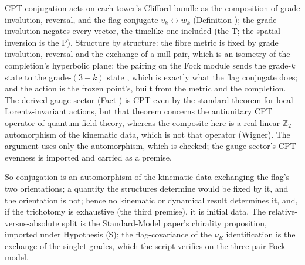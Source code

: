 CPT conjugation acts on each tower's Clifford bundle as the composition of grade involution, reversal, and the flag conjugate $v_{k} \leftrightarrow w_{k}$ (Definition ); the grade involution negates every vector, the timelike one included (the T; the spatial inversion is the P). Structure by structure: the fibre metric is fixed by grade involution, reversal and the exchange of a null pair, which is an isometry of the completion's hyperbolic plane; the pairing on the Fock module sends the grade-$k$ state to the grade-$(3-k)$ state \cite[Prop.~5.6]{ButlerT12}, which is exactly what the flag conjugate does; and the action is the frozen point's, built from the metric and the completion. The derived gauge sector (Fact ) is CPT-even by the standard theorem for local Lorentz-invariant actions, but that theorem concerns the antiunitary CPT operator of quantum field theory, whereas the composite here is a real linear $\mathbb{Z}_{2}$ automorphism of the kinematic data, which is not that operator (Wigner). The argument uses only the automorphism, which is checked; the gauge sector's CPT-evenness is imported and carried as a premise.

So conjugation is an automorphism of the kinematic data exchanging the flag's two orientations; a quantity the structures determine would be fixed by it, and the orientation is not; hence no kinematic or dynamical result determines it, and, if the trichotomy is exhaustive (the third premise), it is initial data. The relative-versus-absolute split is the Standard-Model paper's chirality proposition, imported under Hypothesis (S); the flag-covariance of the $\nu_{R}$ identification is the exchange of the singlet grades, which the script verifies on the three-pair Fock model.
